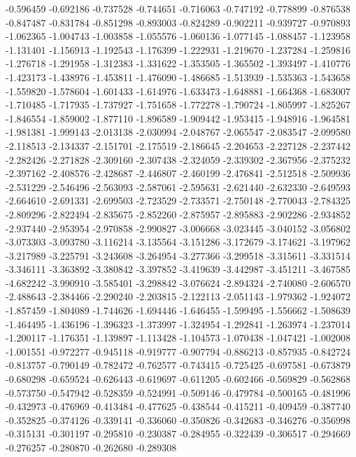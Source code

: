 -0.596459
-0.692186
-0.737528
-0.744651
-0.716063
-0.747192
-0.778899
-0.876538
-0.847487
-0.831784
-0.851298
-0.893003
-0.824289
-0.902211
-0.939727
-0.970893
-1.062365
-1.004743
-1.003858
-1.055576
-1.060136
-1.077145
-1.088457
-1.123958
-1.131401
-1.156913
-1.192543
-1.176399
-1.222931
-1.219670
-1.237284
-1.259816
-1.276718
-1.291958
-1.312383
-1.331622
-1.353505
-1.365502
-1.393497
-1.410776
-1.423173
-1.438976
-1.453811
-1.476090
-1.486685
-1.513939
-1.535363
-1.543658
-1.559820
-1.578604
-1.601433
-1.614976
-1.633473
-1.648881
-1.664368
-1.683007
-1.710485
-1.717935
-1.737927
-1.751658
-1.772278
-1.790724
-1.805997
-1.825267
-1.846554
-1.859002
-1.877110
-1.896589
-1.909442
-1.953415
-1.948916
-1.964581
-1.981381
-1.999143
-2.013138
-2.030994
-2.048767
-2.065547
-2.083547
-2.099580
-2.118513
-2.134337
-2.151701
-2.175519
-2.186645
-2.204653
-2.227128
-2.237442
-2.282426
-2.271828
-2.309160
-2.307438
-2.324059
-2.339302
-2.367956
-2.375232
-2.397162
-2.408576
-2.428687
-2.446807
-2.460199
-2.476841
-2.512518
-2.509936
-2.531229
-2.546496
-2.563093
-2.587061
-2.595631
-2.621440
-2.632330
-2.649593
-2.664610
-2.691331
-2.699503
-2.723529
-2.733571
-2.750148
-2.770043
-2.784325
-2.809296
-2.822494
-2.835675
-2.852260
-2.875957
-2.895883
-2.902286
-2.934852
-2.937440
-2.953954
-2.970858
-2.990827
-3.006668
-3.023445
-3.040152
-3.056802
-3.073303
-3.093780
-3.116214
-3.135564
-3.151286
-3.172679
-3.174621
-3.197962
-3.217989
-3.225791
-3.243608
-3.264954
-3.277366
-3.299518
-3.315611
-3.331514
-3.346111
-3.363892
-3.380842
-3.397852
-3.419639
-3.442987
-3.451211
-3.467585
-4.682242
-3.990910
-3.585401
-3.298842
-3.076624
-2.894324
-2.740080
-2.606570
-2.488643
-2.384466
-2.290240
-2.203815
-2.122113
-2.051143
-1.979362
-1.924072
-1.857459
-1.804089
-1.744626
-1.694446
-1.646455
-1.599495
-1.556662
-1.508639
-1.464495
-1.436196
-1.396323
-1.373997
-1.324954
-1.292841
-1.263974
-1.237014
-1.200117
-1.176351
-1.139897
-1.113428
-1.104573
-1.070438
-1.047421
-1.002008
-1.001551
-0.972277
-0.945118
-0.919777
-0.907794
-0.886213
-0.857935
-0.842724
-0.813757
-0.790149
-0.782472
-0.762577
-0.743415
-0.725425
-0.697581
-0.673879
-0.680298
-0.659524
-0.626443
-0.619697
-0.611205
-0.602466
-0.569829
-0.562868
-0.573750
-0.547942
-0.528359
-0.524991
-0.509146
-0.479784
-0.500165
-0.481996
-0.432973
-0.476969
-0.413484
-0.477625
-0.438544
-0.415211
-0.409459
-0.387740
-0.352825
-0.374126
-0.339141
-0.336060
-0.350826
-0.342683
-0.346276
-0.356998
-0.315131
-0.301197
-0.295810
-0.230387
-0.284955
-0.322439
-0.306517
-0.294669
-0.276257
-0.280870
-0.262680
-0.289308
